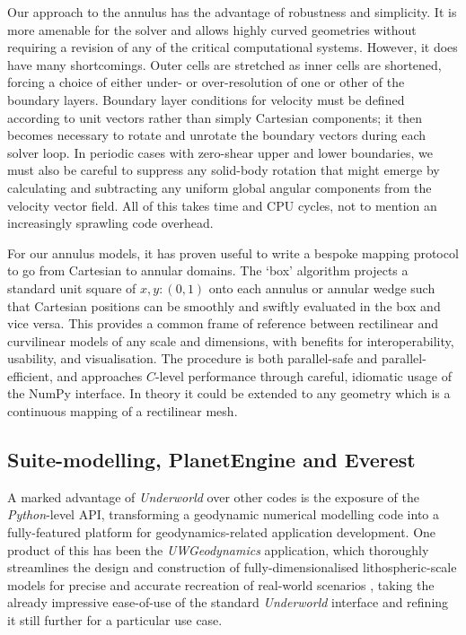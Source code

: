 \documentclass[a4paper,11pt,oneside]{book}
\begin{document}
Our approach to the annulus has the advantage of robustness and simplicity. It is more amenable for the solver and allows highly curved geometries without requiring a revision of any of the critical computational systems. However, it does have many shortcomings. Outer cells are stretched as inner cells are shortened, forcing a choice of either under- or over-resolution of one or other of the boundary layers. Boundary layer conditions for velocity must be defined according to unit vectors rather than simply Cartesian components; it then becomes necessary to rotate and unrotate the boundary vectors during each solver loop. In periodic cases with zero-shear upper and lower boundaries, we must also be careful to suppress any solid-body rotation that might emerge by calculating and subtracting any uniform global angular components from the velocity vector field. All of this takes time and CPU cycles, not to mention an increasingly sprawling code overhead.

For our annulus models, it has proven useful to write a bespoke mapping protocol to go from Cartesian to annular domains. The `box' algorithm projects a standard unit square of $x,y:(0,1)$ onto each annulus or annular wedge such that Cartesian positions can be smoothly and swiftly evaluated in the box and vice versa. This provides a common frame of reference between rectilinear and curvilinear models of any scale and dimensions, with benefits for interoperability, usability, and visualisation. The procedure is both parallel-safe and parallel-efficient, and approaches $C$-level performance through careful, idiomatic usage of the NumPy interface. In theory it could be extended to any geometry which is a continuous mapping of a rectilinear mesh.

\subsection{Suite-modelling, PlanetEngine and Everest}

A marked advantage of \textit{Underworld} over other codes is the exposure of the \textit{Python}-level API, transforming a geodynamic numerical modelling code into a fully-featured platform for geodynamics-related application development. One product of this has been the \textit{UWGeodynamics} application, which thoroughly streamlines the design and construction of fully-dimensionalised lithospheric-scale models for precise and accurate recreation of real-world scenarios \cite{Beucher2019-aq}, taking the already impressive ease-of-use of the standard \textit{Underworld} interface and refining it still further for a particular use case.
\end{document}
